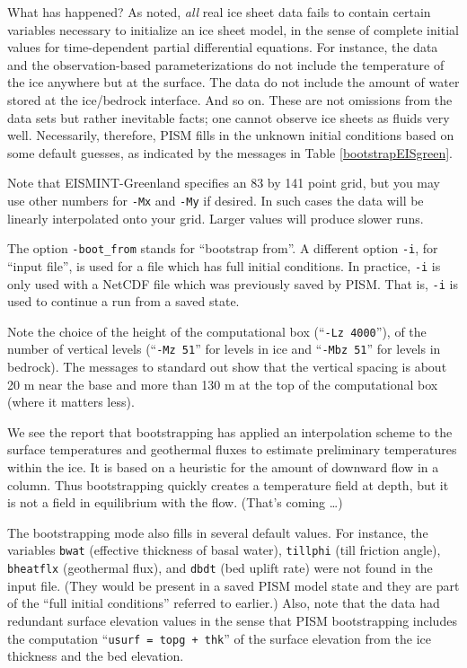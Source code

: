 What has happened?  As noted, \emph{all} real ice sheet data fails to contain certain variables necessary to initialize an ice sheet model, in the sense of complete initial values for time-dependent partial differential equations.  For instance, the data and the observation-based parameterizations do not include the temperature of the ice anywhere but at the surface.  The data do not include the amount of water stored at the ice/bedrock interface.  And so on.  These are not omissions from the data sets but rather inevitable facts; one cannot observe ice sheets as fluids very well.  Necessarily, therefore, PISM fills in the unknown initial conditions based on some default guesses, as indicated by the messages in Table \ref{bootstrapEISgreen}.

Note that EISMINT-Greenland specifies an 83 by 141 point grid, but you may use other numbers for \texttt{-Mx} and \texttt{-My} if desired.  In such cases the data will be linearly interpolated onto your grid.  Larger values will produce slower runs.

The option \texttt{-boot_from} stands for ``bootstrap from''.  A different option \texttt{-i}, for ``input file'', is used for a file which has full initial conditions.  In practice, \texttt{-i} is only used with a NetCDF file which was previously saved by PISM.  That is, \texttt{-i} is used to continue a run from a saved state.

Note the choice of the height of the computational box (``\texttt{-Lz 4000}''), of the number of vertical levels (``\texttt{-Mz 51}'' for levels in ice and ``\texttt{-Mbz 51}'' for levels in bedrock). The messages to standard out show that the vertical spacing is about 20 m near the base and more than 130 m at the top of the computational box (where it matters less).

We see the report that bootstrapping has applied an interpolation scheme to the surface temperatures and geothermal fluxes to estimate preliminary temperatures within the ice.  It is based on a heuristic for the amount of downward flow in a column.  Thus bootstrapping quickly creates a temperature field at depth, but it is not a field in equilibrium with the flow.  (That's coming \dots)

The bootstrapping mode also fills in several default values.  For instance, the variables \texttt{bwat} (effective thickness of basal water), \texttt{tillphi} (till friction angle), \texttt{bheatflx} (geothermal flux), and \texttt{dbdt} (bed uplift rate) were not found in the input file.   (They would be present in a saved PISM model state and they are part of the ``full initial conditions'' referred to earlier.)  Also, note that the data had redundant surface elevation values in the sense that PISM bootstrapping includes the computation ``\texttt{usurf = topg + thk}'' of the surface elevation from the ice thickness and the bed elevation.

